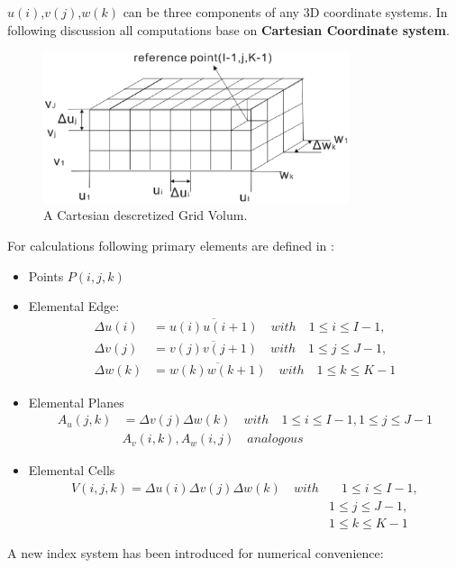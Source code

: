$u(i)$,$v(j)$,$w(k)$ can be three components of any 3D coordinate systems. In following discussion all computations base on \textbf{Cartesian Coordinate system}.\\
\begin{figure}[!ht]
\centering
\includegraphics[width=0.8\textwidth]{bilder/grid_volum}
\caption{A Cartesian descretized Grid Volum\cite{script_FeldSim}.}
\label{fig:discretization_material}
\end{figure}
For calculations following primary elements are defined in \cite{script_FeldSim}:
\begin{itemize}
\item Points $P(i,j,k)$
\item Elemental Edge:
    \begin{align}
		\Delta u(i)&=\overline{u(i)u(i+1)}  \quad with  \quad 1\leq i \leq I-1, \nonumber\\
		\Delta v(j)&=\overline{v(j)v(j+1)}  \quad with  \quad 1\leq j \leq J-1, \nonumber\\
		\Delta w(k)&=\overline{w(k)w(k+1)}  \quad with  \quad 1\leq k \leq K-1
		\label{eq:discrete_edge}
		\end{align}
\item Elemental Planes
		\begin{align}
		A_{u}(j,k)&=\Delta v(j)\Delta w(k) \quad with  \quad 1\leq i \leq I-1,1\leq j \leq J-1\nonumber\\
		&A_{v}(i,k),A_{w}(i,j)  \quad analogous
		\label{eq:discrete_plane}
		\end{align}
\item Elemental Cells
		\begin{align}
		V(i,j,k)=\Delta u(i)\Delta v(j)\Delta w(k)  \quad with  &\quad 1\leq i\leq I-1,\nonumber\\
		&1\leq j\leq J-1,\nonumber\\
		&1\leq k\leq K-1
		\label{eq:discrete_cell}
		\end{align}
\end{itemize}
A new index system has been introduced for numerical convenience:

